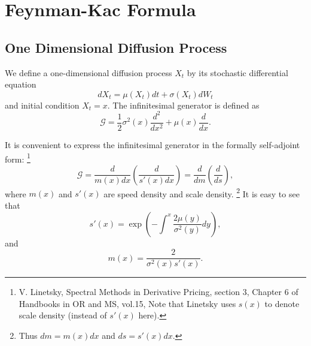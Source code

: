 \chapter{Feynman-Kac Formula}

\section{One Dimensional Diffusion Process} \label{S:diff}
We define a one-dimensional diffusion process $X_t$ by its stochastic
differential equation
\begin{equation}
  dX_t = \mu(X_t) dt + \sigma(X_t) dW_t
\end{equation}
and initial condition $X_t=x$. The infinitesimal generator is defined as
\begin{equation}
  \mathcal{G} = \frac{1}{2} \sigma^2(x) \frac{d^2}{dx^2} + \mu(x)\frac{d}{dx}.
\end{equation}

It is convenient to express the infinitesimal generator in the formally
self-adjoint form:
\footnote{V. Linetsky, Spectral Methods in Derivative Pricing, section 3, 
    Chapter 6 of Handbooks in OR and MS, vol.15, 
    Note that Linetsky uses
    $s(x)$ to denote scale density (instead of $s'(x)$ here).}
\[
  \mathcal{G} = \frac{d}{m(x)dx} \left( \frac{d}{s'(x)dx} \right)
              = \frac{d}{dm} \left( \frac{d}{ds} \right),
\]
where $m(x)$ and $s'(x)$ are speed density and scale density. 
\footnote{Thus $dm=m(x)dx$ and $ds=s'(x)dx$.}
It is easy to see that
\begin{equation}
  s'(x)=\exp\left( -\int^x \frac{2\mu(y)}{\sigma^2(y)} dy \right),
\end{equation}
and 
\begin{equation}
  m(x) = \frac{2}{\sigma^2(x) s'(x)}.
\end{equation}


